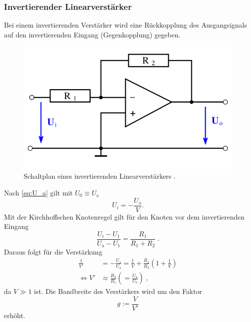 \subsubsection{Invertierender Linearverstärker}
Bei einem invertierenden Verstärker wird eine Rückkopplung des Ausgangsignals auf den invertierenden Eingang (Gegenkopplung) gegeben.
\begin{figure}
    \centering
    \includegraphics[width = .5\textwidth]{"content/pics/inverting.png"}
    \caption{Schaltplan eines invertierenden Linearverstärkers \cite{v51}.}
    \label{fig:inverting}
\end{figure}
Nach \autoref{eq:U_a} gilt mit $U_0 \equiv U_\text{a}$ 
\begin{equation*}
U_i = -\frac{U_\text{a}}{V}.
\end{equation*}
Mit der Kirchhoffschen Knotenregel gilt für den Knoten vor dem invertierenden Eingang 
\begin{equation*}
    \frac{U_i - U_1}{U_\text{a} - U_1} = \frac{R_1}{R_1 + R_2}\;.
\end{equation*}
Daraus folgt für die Verstärkung 
\begin{align}
    \frac{1}{V'} &= -\frac{U_1}{U_\text{a}} = \frac{1}{V} + \frac{R_1}{R_2}\left(1 + \frac{1}{V}\right) \nonumber \\
    \Leftrightarrow V' &\approx \frac{R_2}{R_1} \left( = \frac{U_\text{a}}{U_\text{e}}\right) \;,
    \label{eq:invert}
\end{align}
da $V \gg 1$ ist.
Die Bandbreite des Verstärkers wird um den Faktor 
\begin{equation}
    g := \frac{V}{V'}
\end{equation}
erhöht.

